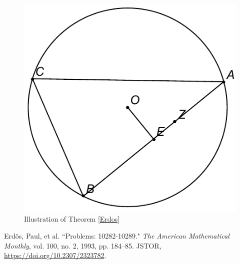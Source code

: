 \begin{figure}[h]
\centering
\caption{Illustration of Theorem \ref{Erdos}}
\label{image2}
\includegraphics{images/image2}
\end{figure}

\begin{thebibliography}{99}

 Erd\"{o}s, Paul, et al. ``Problems: 10282-10289." \textit{The American Mathematical Monthly}, vol. 100, no. 2, 1993, pp. 184–85. JSTOR, \url{https://doi.org/10.2307/2323782}.

\end{thebibliography}



